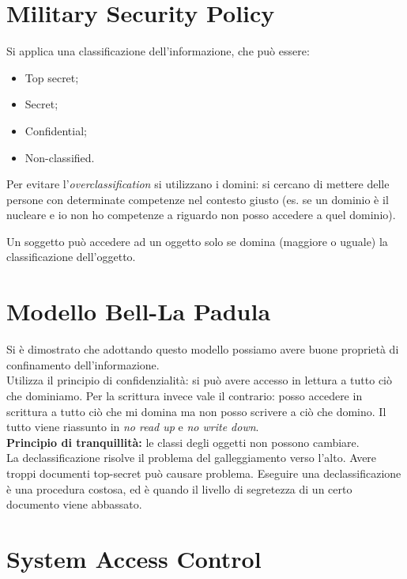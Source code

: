 \section{Military Security Policy}

Si applica una classificazione dell'informazione, che può essere:
\begin{itemize}
 \item Top secret;
 \item Secret;
 \item Confidential;
 \item Non-classified.
\end{itemize}

Per evitare l'\textit{overclassification} si utilizzano i domini: si cercano 
di mettere delle persone con determinate competenze nel contesto giusto (es. 
se un dominio è il nucleare e io non ho competenze a riguardo non posso 
accedere a quel dominio).

Un soggetto può accedere ad un oggetto solo se domina (maggiore o uguale) la 
classificazione dell'oggetto.

\section{Modello Bell-La Padula}

Si è dimostrato che adottando questo modello possiamo avere buone proprietà di
confinamento dell'informazione.\\
Utilizza il principio di confidenzialità: si può avere accesso in lettura a
tutto ciò che dominiamo. Per la scrittura invece vale il contrario: posso
accedere in scrittura a tutto ciò che mi domina ma non posso scrivere a ciò che
domino. Il tutto viene riassunto in \textit{no read up} e \textit{no write
down}.\\
\newline
\textbf{Principio di tranquillità:} le classi degli oggetti non possono 
cambiare.\\
\newline
La declassificazione risolve il problema del galleggiamento verso l'alto. Avere
troppi documenti top-secret può causare problema. Eseguire una
declassificazione è una procedura costosa, ed è quando il livello di segretezza
di un certo documento viene abbassato.

\section{System Access Control}

